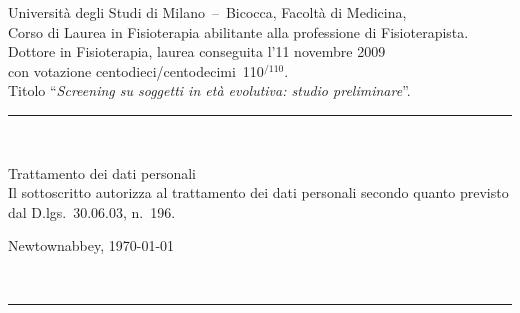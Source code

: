 \documentclass{article}
\newcommand{\titolo}[1]{\bgroup\rule{\linewidth}{1pt}\\[-14pt]
\null\hfill\fontsize{10pt}{12pt}\sc\selectfont\strut#1\\[7pt]\egroup}
\begin{document}
%
{Universit\`a degli Studi di Milano~--~Bicocca, Facolt\`a di Medicina,\\ Corso di Laurea in Fisioterapia abilitante alla professione di Fisioterapista.}%
{Dottore in Fisioterapia, laurea conseguita l'11 novembre 2009\\ con votazione centodieci/centodecimi~110$^{/110}$.\\ Titolo ``\textit{Screening su soggetti in et\`a evolutiva: studio preliminare}''.}

\vfill
\titolo{Trattamento dei dati personali}
Il sottoscritto autorizza al trattamento dei dati personali secondo quanto previsto dal D.lgs.~30.06.03, n.~196.

\vfill
\null\hfill Newtownabbey, \today\\[-7pt]
\null\hfill\begin{minipage}{0.5\linewidth}\centering
\resizebox{0.8\linewidth}{!}{}\\[-16pt]
\rule{\linewidth}{0.5pt}
\end{minipage}
\end{document}
